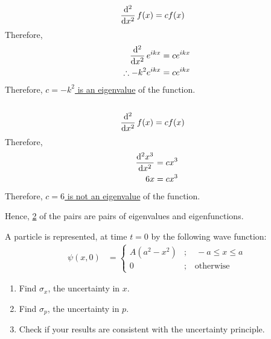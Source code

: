 \documentclass[fleqn, a4paper, 11pt, oneside]{amsart}
\theoremstyle{definition}
\theoremstyle{theorem}
\renewcommand{\emph}{\uline}
\begin{document}
\begin{solution}
\begin{enumerate}[leftmargin=*]
			\begin{align*}
				\dod[2]{}{x} f(x) & = c f(x)
			\end{align*}
			Therefore,
			\begin{align*}
				\dod[2]{}{x} e^{i k x}    & = c e^{i k x} \\
				\therefore -k^2 e^{i k x} & = c e^{i k x}
			\end{align*}
			Therefore, \emph{$c = -k^2$ is an eigenvalue} of the function.\\
			~\\
			\begin{align*}
				\dod[2]{}{x} f(x) & = c f(x)
			\end{align*}
			Therefore,
			\begin{align*}
				\dod[2]{x^3}{x} & = c x^3 \\
				6 x             & = c x^3
			\end{align*}
			Therefore, \emph{$c = 6$ is not an eigenvalue} of the function.
	\end{enumerate}
	Hence, \emph{2} of the pairs are pairs of eigenvalues and eigenfunctions.
\end{solution}

\begin{question}
		A particle is represented, at time $t=0$ by the following wave function:
		\begin{align*}
			\psi(x,0) &=
				\begin{cases}
					A \left( a^2 - x^2 \right) & ;\quad -a \le x \le a \\
					0                          & ;\quad \text{otherwise}
				\end{cases}
		\end{align*}
		\begin{enumerate}
			\item Find $\sigma_x$, the uncertainty in $x$.
			\item Find $\sigma_p$, the uncertainty in $p$.
			\item Check if your results are consistent with the uncertainty principle.
		\end{enumerate}
\end{question}
\end{document}
